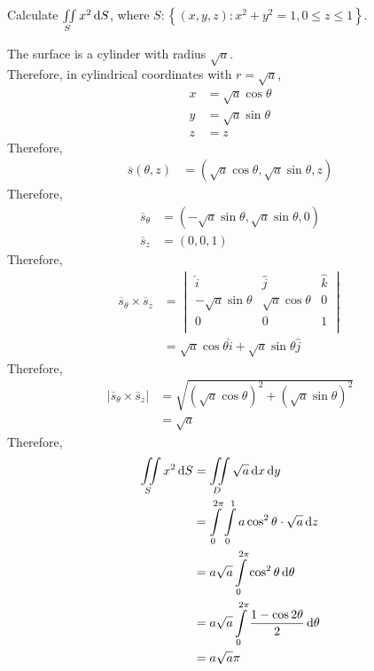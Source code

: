 \documentclass[fleqn, a4paper, 12pt, twoside]{article}
\theoremstyle{definition}
\theoremstyle{theorem}
\begin{document}
\begin{question}
	Calculate $\iint\limits_{S} x^2 \dif S$, where $S : \left\{ (x,y,z) : x^2 + y^2 = 1 , 0 \le z \le 1 \right\}$.
\end{question}

\begin{solution}
	The surface is a cylinder with radius $\sqrt{a}$.\\
	Therefore, in cylindrical coordinates with $r = \sqrt{a}$,
	\begin{align*}
		x & = \sqrt{a} \cos \theta \\
		y & = \sqrt{a} \sin \theta \\
		z & = z
	\end{align*}
	Therefore,
	\begin{align*}
		\overline{s}(\theta,z) & = \left( \sqrt{a} \cos \theta , \sqrt{a} \sin \theta , z \right)
	\end{align*}
	Therefore,
	\begin{align*}
		\overline{s}_{\theta} & = \left( -\sqrt{a} \sin \theta , \sqrt{a} \sin \theta , 0 \right) \\
		\overline{s}_z        & = (0 , 0 , 1)
	\end{align*}
	Therefore,
	\begin{align*}
		\overline{s}_{\theta} \times \overline{s}_z &=
			\begin{vmatrix}
				\hat{i}               & \hat{j}              & \hat{k} \\
				-\sqrt{a} \sin \theta & \sqrt{a} \cos \theta & 0       \\
				0                     & 0                    & 1       \\
			\end{vmatrix}\\
		&= \sqrt{a} \cos \theta \hat{i} + \sqrt{a} \sin \theta \hat{j}
	\end{align*}
	Therefore,
	\begin{align*}
		\left| \overline{s}_{\theta} \times \overline{s}_z \right| & = \sqrt{\left( \sqrt{a} \cos \theta \right)^2 + \left( \sqrt{a} \sin \theta \right)^2} \\
                                                                           & = \sqrt{a}
	\end{align*}
	Therefore,
	\begin{align*}
		\iint\limits_{S} x^2 \dif S & = \iint\limits_{D} \sqrt{a} \dif x \dif y                                           \\
                                            & = \int\limits_{0}^{2 \pi} \int\limits_{0}^{1} a \cos^2 \theta \cdot \sqrt{a} \dif z \\
                                            & = a \sqrt{a} \int\limits_{0}^{2 \pi} \cos^2 \theta \dif \theta                      \\
                                            & = a \sqrt{a} \int\limits_{0}^{2 \pi} \frac{1 - \cos 2 \theta}{2} \dif \theta        \\
                                            & = a \sqrt{a} \pi
	\end{align*}
\end{solution}
\end{document}
